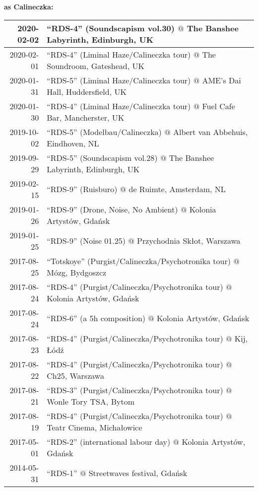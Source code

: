 \documentclass[a4paper]{article}
\begin{document}
\vspace{4mm}
\textbf{as Calineczka:}

\vspace{2mm}

\begin{tabularx}{\textwidth}{r l}
\hline
2020-02-02 & ``RDS-4'' (Soundscapism vol.30) $@$ The Banshee Labyrinth, Edinburgh, UK \\
\hline
2020-02-01 & ``RDS-4'' (Liminal Haze/Calineczka tour) $@$ The Soundroom, Gateshead, UK \\
\hline
2020-01-31 & ``RDS-5'' (Liminal Haze/Calineczka tour) $@$ AME's Dai Hall, Huddersfield, UK \\
\hline
2020-01-30 & ``RDS-4'' (Liminal Haze/Calineczka tour) $@$ Fuel Cafe Bar, Mancherster, UK \\
\hline
2019-10-02 & ``RDS-5'' (Modelbau/Calineczka) $@$ Albert van Abbehuis, Eindhoven, NL \\
\hline
2019-09-29 & ``RDS-5'' (Soundscapism vol.28) $@$ The Banshee Labyrinth, Edinburgh, UK \\
\hline
2019-02-15 & ``RDS-9'' (Ruisburo) $@$ de Ruimte, Amsterdam, NL \\
\hline
2019-01-26 & ``RDS-9'' (Drone, Noise, No Ambient) $@$ Kolonia Artystów, Gdańsk \\
\hline
2019-01-25 & ``RDS-9'' (Noise 01.25) $@$ Przychodnia Skłot, Warszawa \\
\hline
2017-08-25 & ``Totskoye'' (Purgist/Calineczka/Psychotronika tour) $@$ Mózg, Bydgoszcz \\
\hline
2017-08-24 & ``RDS-4'' (Purgist/Calineczka/Psychotronika tour) $@$ Kolonia Artystów, Gdańsk \\
\hline
2017-08-24 & ``RDS-6'' (a 5h composition) $@$ Kolonia Artystów, Gdańsk \\
\hline
2017-08-23 & ``RDS-4'' (Purgist/Calineczka/Psychotronika tour) $@$ Kij, Łódź \\
\hline
2017-08-22 & ``RDS-4'' (Purgist/Calineczka/Psychotronika tour) $@$ Ch25, Warszawa \\
\hline
2017-08-21 & ``RDS-3'' (Purgist/Calineczka/Psychotronika tour) $@$ Wonle Tory TSA, Bytom \\
\hline
2017-08-19 & ``RDS-4'' (Purgist/Calineczka/Psychotronika tour) $@$ Teatr Cinema, Michałowice \\
\hline
2017-05-01 & ``RDS-2'' (international labour day) $@$ Kolonia Artystów, Gdańsk \\
\hline
2014-05-31 & ``RDS-1'' $@$ Streetwaves festival, Gdańsk \\
\end{tabularx}
\end{document}
